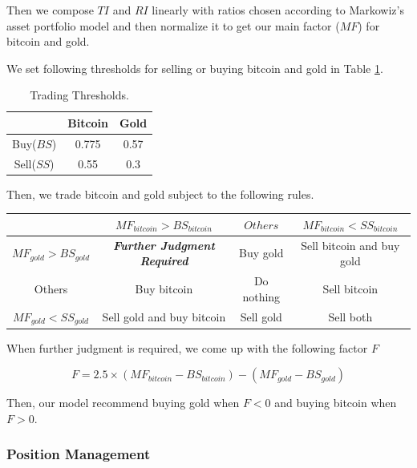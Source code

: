 \documentclass[12pt,a4paper]{article}
\begin{document}
\begin{spacing}{1.2}
Then we compose $TI$ and $RI$ linearly with ratios chosen according to Markowiz's asset portfolio model and then normalize it to get our main factor ($MF$) for bitcoin and gold. 
	
We set following thresholds for selling or buying bitcoin and gold in Table \ref{table:threshold}.
	
\begin{table}[H]
		\renewcommand{\arraystretch}{1.5}
		\caption{Trading Thresholds.}
		\label{table:threshold}
		\begin{center}
			{\footnotesize
				\begin{tabular}{c c c}
					\toprule
					{ } & {Bitcoin} & {Gold} \\
					\midrule
					Buy($BS$) & 0.775 & 0.57 \\
					Sell($SS$) & 0.55 & 0.3 \\
					\bottomrule
			\end{tabular}}
		\end{center}	
\end{table}
	
Then, we trade bitcoin and gold subject to the following rules.
	
\begin{center}
		\begin{tabular}{ |c|c|c|c| } 
			\hline
			& $MF_{bitcoin} > BS_{bitcoin}$ & $Others$ & $MF_{bitcoin} < SS_{bitcoin}$ \\ 
			\hline
			$MF_{gold} > BS_{gold}$ & \textbf{\textit{Further Judgment Required}}  & Buy gold & Sell bitcoin and buy gold  \\ 
			\hline
			Others & Buy bitcoin & Do nothing & Sell bitcoin \\
			\hline
			$MF_{gold} < SS_{gold}$ & Sell gold and buy bitcoin & Sell gold & Sell both \\ 
			\hline
		\end{tabular}
\end{center}
	
When further judgment is required, we come up with the following factor $F$ 
	
$$
F=2.5 \times (MF_{bitcoin}-BS_{bitcoin})-(MF_{gold}-BS_{gold})
$$
	
Then, our model recommend buying gold when $F<0$ and buying bitcoin when $F>0$.

\subsubsection{Position Management}




\end{spacing}
\end{document}
